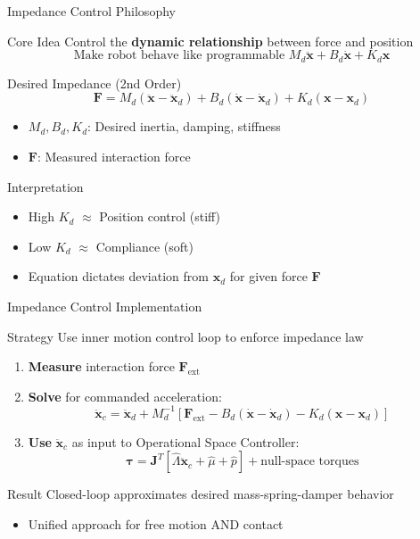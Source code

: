 \documentclass[10pt]{beamer}
\newcommand{\vect}[1]{\boldsymbol{#1}}
\newcommand{\tauvec}{\vect{\tau}}
\newcommand{\x}{\vect{x}}
\newcommand{\J}{\vect{J}}
\newcommand{\F}{\vect{F}}
\begin{document}
\begin{frame}{Impedance Control Philosophy}
    \begin{block}{Core Idea}
        Control the \textbf{dynamic relationship} between force and position
        \[
        \text{Make robot behave like programmable } M_d\ddot{\x} + B_d\dot{\x} + K_d\x
        \]
    \end{block}
    
    \begin{block}{Desired Impedance (2nd Order)}
    \[
    \F = M_d(\ddot{\x} - \ddot{\x}_d) + B_d(\dot{\x} - \dot{\x}_d) + K_d(\x - \x_d)
    \]
    \begin{itemize}
        \item $M_d, B_d, K_d$: Desired inertia, damping, stiffness
        \item $\F$: Measured interaction force
    \end{itemize}
    \end{block}
    
    \begin{exampleblock}{Interpretation}
        \begin{itemize}
            \item High $K_d$ $\approx$ Position control (stiff)
            \item Low $K_d$ $\approx$ Compliance (soft)
            \item Equation dictates deviation from $\x_d$ for given force $\F$
        \end{itemize}
    \end{exampleblock}
\end{frame}

\begin{frame}{Impedance Control Implementation}
    \begin{block}{Strategy}
        Use inner motion control loop to enforce impedance law
    \end{block}
    
    \begin{enumerate}
        \item \textbf{Measure} interaction force $\F_{\text{ext}}$
        \item \textbf{Solve} for commanded acceleration:
        \[
        \ddot{\x}_c = \ddot{\x}_d + M_d^{-1}\left[\F_{\text{ext}} - B_d(\dot{\x} - \dot{\x}_d) - K_d(\x - \x_d)\right]
        \]
        \item \textbf{Use} $\ddot{\x}_c$ as input to Operational Space Controller:
        \[
        \tauvec = \J^T\left[\hat{\Lambda}\ddot{\x}_c + \hat{\mu} + \hat{p}\right] + \text{null-space torques}
        \]
    \end{enumerate}
    
    \begin{block}{Result}
        Closed-loop approximates desired mass-spring-damper behavior
        \begin{itemize}
            \item Unified approach for free motion AND contact
        \end{itemize}
    \end{block}
\end{frame}
\end{document}
